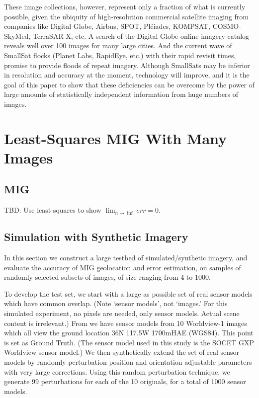 \documentclass[10pt]{amsart}
\begin{document}
These image collections, however, represent only a fraction of what is currently
possible, given the ubiquity of high-resolution commercial satellite imaging
from companies like Digital Globe, Airbus, SPOT, Pl\'eiades, KOMPSAT,
COSMO-SkyMed, TerraSAR-X, etc. A search of the Digital Globe online imagery
catalog \cite{BROWSE_DG} reveals well over 100 images for many large cities. And
the current wave of SmallSat flocks (Planet Labs, RapidEye, etc.) with their
rapid revisit times, promise to provide floods of repeat imagery. Although
SmallSats may be inferior in resolution and accuracy at the moment, technology
will improve, and it is the goal of this paper to show that these deficiencies
can be overcome by the power of large amounts of statistically independent
information from huge numbers of images.

\section{Least-Squares MIG With Many Images}
\subsection{MIG}\label{MIG}
TBD: Use least-squares to show $\lim_{n\rightarrow\inf}err=0$.

\subsection{Simulation with Synthetic Imagery}
In this section we construct a large testbed of simulated/synthetic imagery, and
evaluate the accuracy of MIG geolocation and error estimation, on samples of
randomly-selected subsets of images, of size ranging from 4 to 1000.

To develop the test set, we start with a large as possible set of real sensor
models which have common overlap. (Note `sensor models', not `images.' For
this simulated experiment, no pixels are needed, only sensor models. Actual
scene content is irrelevant.)  From \cite{MIN} we have sensor models from 10
Worldview-1 images which all view the ground location 36N 117.5W 1700mHAE
(WGS84). This point is set as Ground Truth. (The sensor model used in this study
is the SOCET GXP \cite{SGXP} Worldview sensor model.) We then synthetically
extend the set of real sensor models by randomly perturbation position and
orientation adjustable parameters with very large corrections. Using this random
perturbation technique, we generate 99 perturbations for each of the 10
originals, for a total of 1000 sensor models.
\end{document}
